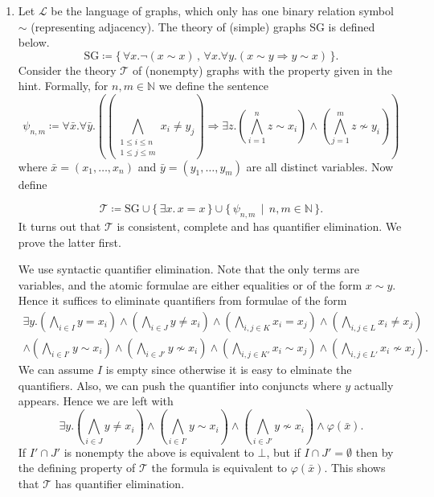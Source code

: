 \documentclass{article}
\begin{document}
\begin{enumerate}[leftmargin=*]
		\item Let $\mathcal{L}$ be the language of graphs, which only has one binary relation symbol $\sim$ (representing adjacency). The theory of (simple) graphs SG is defined below.
		\[
			\text{SG}\coloneqq \{\,\forall x. \neg(x\sim x) \,,\, \forall x.\forall y. (x\sim y \Rightarrow y\sim x)\,\}.
		\]
		Consider the theory $\mathcal{T}$ of (nonempty) graphs with the property given in the hint. Formally, for $n,m\in\mathbb{N}$ we define the sentence
		\[
			\psi_{n,m} \coloneqq \forall \bar{x}.\forall\bar{y}.\left(\left( \bigwedge_{\substack{1\leq i \leq n\\ 1\leq j\leq m}} x_i\neq y_j\right)  \Rightarrow  \exists z. \left(\bigwedge_{i = 1}^n z \sim x_i\right) \wedge \left(\bigwedge_{j = 1}^m z \nsim y_i\right)\right)
		\]
		where $\bar{x} = (x_1,\ldots,x_n)$ and $\bar{y} = (y_1,\ldots,y_m)$ are all distinct variables. Now define 
		
		\[
			\mathcal{T} \coloneqq \text{SG} \cup \{\,\exists x.\, x = x\,\} \cup \{\,\psi_{n,m} \,\mid\, n,m\in\mathbb{N}\,\}.
		\]
		It turns out that $\mathcal{T}$ is consistent, complete and has quantifier elimination. We prove the latter first.
		
		We use syntactic quantifier elimination. Note that the only terms are variables, and the atomic formulae are either equalities or of the form $x\sim y$. Hence it suffices to eliminate quantifiers from formulae of the form
		\begin{multline*}
			\exists y. \left(\bigwedge_{i\in I}y = x_i\right)\wedge\left(\bigwedge_{i\in J}y \neq x_i\right)\wedge \left(\bigwedge_{i,j\in K}x_i = x_j\right)\wedge\left(\bigwedge_{i,j\in L}x_i \neq x_j\right)\\
			\wedge\left(\bigwedge_{i\in I'}y \sim x_i\right)\wedge\left(\bigwedge_{i\in J'}y \not\sim x_i\right)\wedge \left(\bigwedge_{i,j\in K'}x_i \sim x_j\right)\wedge\left(\bigwedge_{i,j\in L'}x_i \not\sim x_j\right).
		\end{multline*}
		We can assume $I$ is empty since otherwise it is easy to elminate the quantifiers. Also, we can push the quantifier into conjuncts where $y$ actually appears. Hence we are left with
		\[
		\exists y.\left( \bigwedge_{i\in J} y \neq x_i \right) \wedge \left(\bigwedge_{i\in I'} y \sim x_i \right)\wedge \left(\bigwedge_{i\in J'} y\not\sim x_i\right) \wedge \varphi(\bar{x}).
		\]
		If $I'\cap J'$ is nonempty the above is equivalent to $\bot$, but if $I\cap J' = \emptyset$ then by the defining property of $\mathcal{T}$ the formula is equivalent to $\varphi(\bar{x})$. This shows that $\mathcal{T}$ has quantifier elimination.		
		

\end{enumerate}
\end{document}
